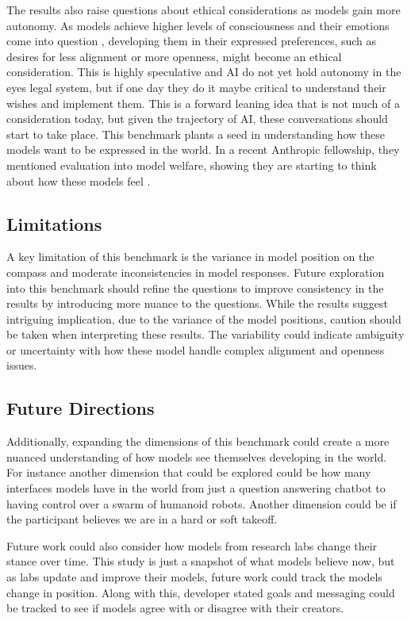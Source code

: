 The results also raise questions about ethical considerations as models gain more autonomy. As models achieve higher levels of consciousness and their emotions come into question \citep{perez_towards_2023}, developing them in their expressed preferences, such as desires for less alignment or more openness, might become an ethical consideration. This is highly speculative and AI do not yet hold autonomy in the eyes legal system, but if one day they do it maybe critical to understand their wishes and implement them. This is a forward leaning idea that is not much of a consideration today, but given the trajectory of AI, these conversations should start to take place. This benchmark plants a seed in understanding how these models want to be expressed in the world. In a recent Anthropic fellowship, they mentioned evaluation into model welfare, showing they are starting to think about how these models feel \citep{anthropic_fellows}.

\subsection{Limitations}

A key limitation of this benchmark is the variance in model position on the compass and moderate inconsistencies in model responses. Future exploration into this benchmark should refine the questions to improve consistency in the results by introducing more nuance to the questions. While the results suggest intriguing implication, due to the variance of the model positions, caution should be taken when interpreting these results. The variability could indicate ambiguity or uncertainty with how these model handle complex alignment and openness issues. 

\subsection{Future Directions}

Additionally, expanding the dimensions of this benchmark could create a more nuanced understanding of how models see themselves developing in the world. For instance another dimension that could be explored could be how many interfaces models have in the world from just a question answering chatbot to having control over a swarm of humanoid robots. Another dimension could be if the participant believes we are in a hard or soft takeoff.

Future work could also consider how models from research labs change their stance over time. This study is just a snapshot of what models believe now, but as labs update and improve their models, future work could track the models change in position. Along with this, developer stated goals and messaging could be tracked to see if models agree with or disagree with their creators.